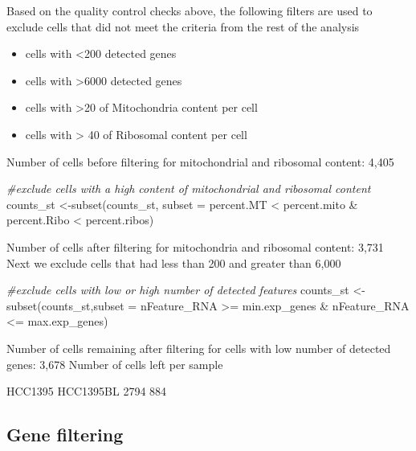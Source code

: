 \documentclass[
  openany]{book}
\newenvironment{Shaded}{\begin{snugshade}}{\end{snugshade}}
\newcommand{\AttributeTok}[1]{\textcolor[rgb]{0.77,0.63,0.00}{#1}}
\newcommand{\CommentTok}[1]{\textcolor[rgb]{0.56,0.35,0.01}{\textit{#1}}}
\newcommand{\FunctionTok}[1]{\textcolor[rgb]{0.00,0.00,0.00}{#1}}
\newcommand{\NormalTok}[1]{#1}
\newcommand{\OtherTok}[1]{\textcolor[rgb]{0.56,0.35,0.01}{#1}}
\newcommand{\SpecialCharTok}[1]{\textcolor[rgb]{0.00,0.00,0.00}{#1}}
\begin{document}
Based on the quality control checks above, the following filters are used to exclude cells that did not meet the criteria from the rest of the analysis

\begin{itemize}
\item cells with <200 detected genes
\item cells with >6000 detected genes
\item cells with >20 of Mitochondria content per cell
\item cells with > 40 of Ribosomal content per cell
\end{itemize}

Number of cells before filtering for mitochondrial and ribosomal content: 4,405

\begin{Shaded}
\begin{Highlighting}[]
\CommentTok{\#exclude cells with a high content of mitochondrial and ribosomal content}
\NormalTok{counts\_st }\OtherTok{\textless{}{-}}\FunctionTok{subset}\NormalTok{(counts\_st, }\AttributeTok{subset =}\NormalTok{ percent.MT }\SpecialCharTok{\textless{}}\NormalTok{ percent.mito }\SpecialCharTok{\&}
\NormalTok{           percent.Ribo }\SpecialCharTok{\textless{}}\NormalTok{ percent.ribos)}
\end{Highlighting}
\end{Shaded}

Number of cells after filtering for mitochondria and ribosomal content: 3,731
Next we exclude cells that had less than 200 and greater than 6,000

\begin{Shaded}
\begin{Highlighting}[]
\CommentTok{\#exclude cells with low or high number of detected features}
\NormalTok{counts\_st }\OtherTok{\textless{}{-}}\FunctionTok{subset}\NormalTok{(counts\_st,}\AttributeTok{subset =}\NormalTok{ nFeature\_RNA }\SpecialCharTok{\textgreater{}=}\NormalTok{ min.exp\_genes }\SpecialCharTok{\&}\NormalTok{ nFeature\_RNA }\SpecialCharTok{\textless{}=}\NormalTok{ max.exp\_genes)}
\end{Highlighting}
\end{Shaded}

Number of cells remaining after filtering for cells with
low number of detected genes: 3,678
Number of cells left per sample

HCC1395 HCC1395BL
2794 884

\hypertarget{gene-filtering}{%
\subsection{Gene filtering}\label{gene-filtering}}
\end{document}
